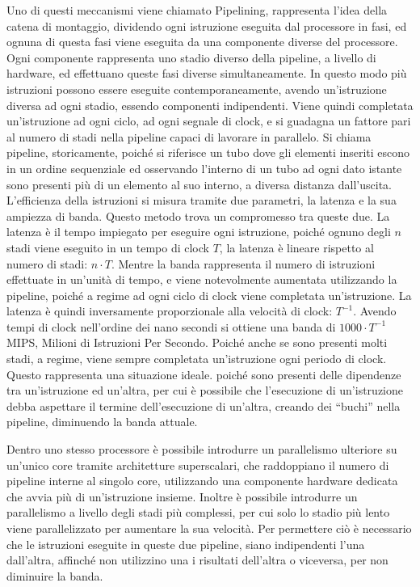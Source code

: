 \documentclass{article}
\numberwithin{equation}{subsection}
\begin{document}
Uno di questi meccanismi viene chiamato Pipelining, rappresenta l'idea della catena di montaggio, dividendo ogni istruzione eseguita dal processore in fasi, ed ognuna di questa fasi viene eseguita da una componente 
diverse del processore. Ogni componente rappresenta uno stadio diverso della pipeline, a livello di hardware, ed effettuano queste fasi diverse simultaneamente. In questo modo più istruzioni possono essere eseguite 
contemporaneamente, avendo un'istruzione diversa ad ogni stadio, essendo componenti indipendenti. Viene quindi completata un'istruzione ad ogni ciclo, ad ogni segnale di clock, e si guadagna un fattore pari al numero 
di stadi nella pipeline capaci di lavorare in parallelo. Si chiama pipeline, storicamente, poiché si riferisce un tubo dove gli elementi inseriti escono in un ordine sequenziale ed osservando l'interno di un tubo ad 
ogni dato istante sono presenti più di un elemento al suo interno, a diversa distanza dall'uscita. 
L'efficienza della istruzioni si misura tramite due parametri, la latenza e la sua ampiezza di banda. Questo metodo trova un compromesso tra queste due. La latenza è il tempo 
impiegato per eseguire ogni istruzione, poiché ognuno degli $n$ stadi viene eseguito in un tempo di clock $T$, la latenza è lineare rispetto al numero di stadi: $n\cdot T$. Mentre la banda rappresenta il numero 
di istruzioni effettuate in un'unità di tempo, e viene 
notevolmente aumentata utilizzando la pipeline, poiché a regime ad ogni ciclo di clock viene completata un'istruzione. La latenza è quindi inversamente proporzionale alla velocità di clock: $T^{-1}$. Avendo tempi di 
clock nell'ordine dei nano secondi si ottiene una banda di $1000\cdot T^{-1}$ MIPS, Milioni di Istruzioni Per Secondo. Poiché anche se sono presenti molti stadi, a regime, viene sempre completata 
un'istruzione ogni periodo di clock. Questo rappresenta una situazione ideale. poiché sono presenti delle dipendenze tra un'istruzione ed un'altra, 
per cui è possibile che l'esecuzione di un'istruzione debba aspettare il termine dell'esecuzione di un'altra, creando dei ``buchi'' nella pipeline, diminuendo la banda attuale. 


Dentro uno stesso processore è possibile introdurre un parallelismo ulteriore su un'unico core tramite architetture superscalari, che raddoppiano il numero di pipeline 
interne al singolo core, utilizzando una componente hardware dedicata che avvia più di un'istruzione insieme. 
Inoltre è possibile introdurre un parallelismo a livello degli stadi più complessi, per cui solo lo stadio più lento viene parallelizzato per aumentare la sua velocità. Per permettere ciò è necessario che le 
istruzioni eseguite in queste due pipeline, siano indipendenti l'una dall'altra, affinché non utilizzino una i risultati dell'altra o viceversa, per non diminuire la banda. 
\end{document}
